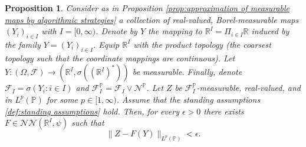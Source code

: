 \documentclass[11pt,a4paper,twoside,openany]{report}
\numberwithin{equation}{section}
\theoremstyle{plain} %
\newtheorem{proposition}[theorem]{Proposition}
\theoremstyle{definition} %
\theoremstyle{remark} %
\begin{document}
\begin{proposition}\label{prop:reduction to countably generated sigma algebra is not fundamental, product topology}\label{prop:reduction to countably generated sigma algebra is not fundamental}
    Consider as in Proposition \ref{prop:approximation of measurable maps by algorithmic strategies} a collection of real-valued, Borel-measurable maps \((Y_{i})_{i\in I}\) with \(I=[0,\infty)\). Denote by \(Y\) the mapping to \(\mathbb{R}^I=\Pi_{i\in I}\mathbb{R}\) induced by the family \(Y=(Y_i)_{i\in I}\). Equip \(\mathbb{R}^I\) with the product topology (the coarsest topology such that the coordinate mappings are continuous). Let \(Y:(\Omega,\mathcal{F})\to (\mathbb{R}^I,\sigma((\mathbb{R}^I)^*))\) be measurable. Finally, denote \(\mathcal{F}_I=\sigma(Y_i:i\in I)\) and \(\mathcal{F}_I^{\mathbb{P}}=\mathcal{F}_I\vee\mathcal{N}^{\mathbb{P}}\). Let \(Z\) be \(\mathcal{F}_I^{\mathbb{P}}\)-measurable, real-valued, and in \(L^p(\mathbb{P})\) for some \(p\in[1,\infty)\). Assume that the standing assumptions \ref{def:standing assumptions} hold. Then, for every \(\epsilon>0\) there exists \(F\in\mathcal{NN}(\mathbb{R}^I,\psi)\) such that 
    \begin{equation*}
        \lVert Z-F(Y)\rVert_{L^p(\mathbb{P})}<\epsilon.
    \end{equation*}
\end{proposition}
\end{document}
